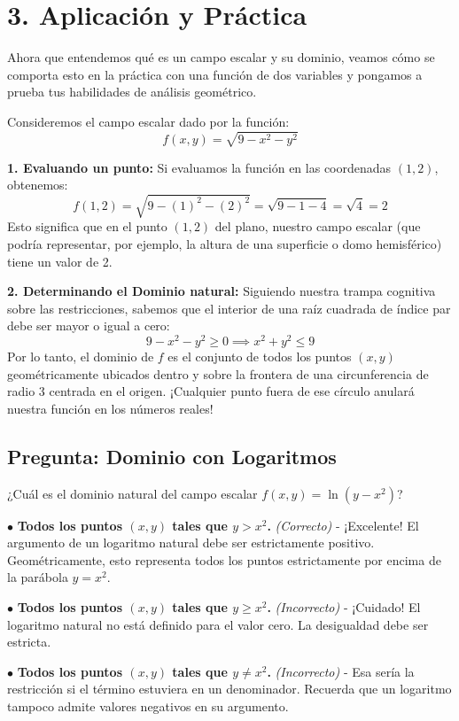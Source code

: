 \documentclass[11pt]{article}
\newenvironment{aplicacion}{%
  \section*{3. Aplicación y Práctica}%
}{}
\newenvironment{ejemplo}[1]{%
  \begin{tcolorbox}[colback=white,colframe=gray!40,title=Ejemplo: #1]%
}{%
  \end{tcolorbox}%
}
\newenvironment{preguntaalternativas}[1]{\subsection*{Pregunta: #1}\par\vspace{0.1cm}}{\vspace{0.3cm}}
\newcommand{\opcion}[3]{\par\noindent $\bullet$ \textbf{#1} \textit{(#2)} - #3\par\vspace{0.15cm}}
\begin{document}
\begin{aplicacion}
  Ahora que entendemos qué es un campo escalar y su dominio, veamos cómo se comporta esto en la práctica con una función de dos variables y pongamos a prueba tus habilidades de análisis geométrico.

  \begin{ejemplo}{Evaluando un Campo Escalar y su Dominio}
    Consideremos el campo escalar dado por la función:
    $$ f(x,y) = \sqrt{9 - x^2 - y^2} $$
    
    \textbf{1. Evaluando un punto:}
    Si evaluamos la función en las coordenadas $(1, 2)$, obtenemos:
    $$ f(1,2) = \sqrt{9 - (1)^2 - (2)^2} = \sqrt{9 - 1 - 4} = \sqrt{4} = 2 $$
    Esto significa que en el punto $(1,2)$ del plano, nuestro campo escalar (que podría representar, por ejemplo, la altura de una superficie o domo hemisférico) tiene un valor de 2.
    
    \textbf{2. Determinando el Dominio natural:}
    Siguiendo nuestra trampa cognitiva sobre las restricciones, sabemos que el interior de una raíz cuadrada de índice par debe ser mayor o igual a cero:
    $$ 9 - x^2 - y^2 \geq 0 \implies x^2 + y^2 \leq 9 $$
    Por lo tanto, el dominio de $f$ es el conjunto de todos los puntos $(x,y)$ geométricamente ubicados dentro y sobre la frontera de una circunferencia de radio 3 centrada en el origen. ¡Cualquier punto fuera de ese círculo anulará nuestra función en los números reales!
  \end{ejemplo}

  \begin{preguntaalternativas}{Dominio con Logaritmos}
    ¿Cuál es el dominio natural del campo escalar $f(x,y) = \ln(y - x^2)$?
    \opcion{Todos los puntos $(x,y)$ tales que $y > x^2$.}{Correcto}{¡Excelente! El argumento de un logaritmo natural debe ser estrictamente positivo. Geométricamente, esto representa todos los puntos estrictamente por encima de la parábola $y = x^2$.}
    \opcion{Todos los puntos $(x,y)$ tales que $y \geq x^2$.}{Incorrecto}{¡Cuidado! El logaritmo natural no está definido para el valor cero. La desigualdad debe ser estricta.}
    \opcion{Todos los puntos $(x,y)$ tales que $y \neq x^2$.}{Incorrecto}{Esa sería la restricción si el término estuviera en un denominador. Recuerda que un logaritmo tampoco admite valores negativos en su argumento.}
  \end{preguntaalternativas}


\end{aplicacion}
\end{document}

